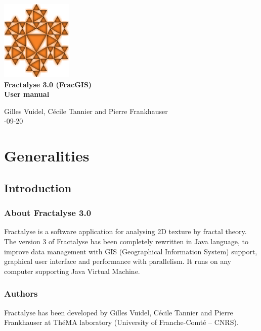 \documentclass[a4paper,10pt]{report}
\begin{document}
\begin{titlepage}
	
	\centering
	\includegraphics[scale=0.5]{img/logo.png}\\
	
	\bigskip
	\bigskip
	\bigskip	
	{\Huge
		\bfseries
		Fractalyse 3.0 (FracGIS)\\
		\bigskip
		User manual\\
	}
	\bigskip
	\bigskip
	\bigskip
	\bigskip
	\bigskip
	
	{\Large		
		Gilles Vuidel, Cécile Tannier and Pierre Frankhauser\\
		-09-20\\
	}
	
\end{titlepage}

\parindent 0pt

\tableofcontents

\part{Generalities}

\chapter{Introduction}
\section{About Fractalyse 3.0}
Fractalyse is a software application for analysing 2D texture by fractal theory. 
The version 3 of Fractalyse has been completely rewritten in Java language, to improve data management with GIS (Geographical Information System) support, graphical user interface and performance with parallelism. It runs on any computer supporting Java Virtual Machine.
\section{Authors}
Fractalyse has been developed by Gilles Vuidel, Cécile Tannier and Pierre Frankhauser at ThéMA laboratory (University of Franche-Comté – CNRS). 
\end{document}
